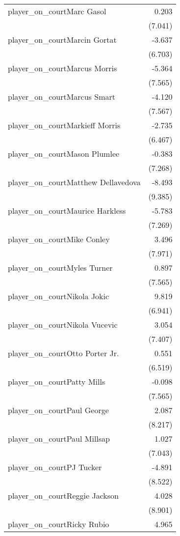 \documentclass[
  landscape]{article}
\begin{document}
\begin{table}[!htbp]
\begin{tabular}{@{\extracolsep{5pt}}lD{.}{.}{-3} }
  player\_on\_courtMarc Gasol & 0.203 \\ 
  & (7.041) \\ 
  player\_on\_courtMarcin Gortat & -3.637 \\ 
  & (6.703) \\ 
  player\_on\_courtMarcus Morris & -5.364 \\ 
  & (7.565) \\ 
  player\_on\_courtMarcus Smart & -4.120 \\ 
  & (7.567) \\ 
  player\_on\_courtMarkieff Morris & -2.735 \\ 
  & (6.467) \\ 
  player\_on\_courtMason Plumlee & -0.383 \\ 
  & (7.268) \\ 
  player\_on\_courtMatthew Dellavedova & -8.493 \\ 
  & (9.385) \\ 
  player\_on\_courtMaurice Harkless & -5.783 \\ 
  & (7.269) \\ 
  player\_on\_courtMike Conley & 3.496 \\ 
  & (7.971) \\ 
  player\_on\_courtMyles Turner & 0.897 \\ 
  & (7.565) \\ 
  player\_on\_courtNikola Jokic & 9.819 \\ 
  & (6.941) \\ 
  player\_on\_courtNikola Vucevic & 3.054 \\ 
  & (7.407) \\ 
  player\_on\_courtOtto Porter Jr. & 0.551 \\ 
  & (6.519) \\ 
  player\_on\_courtPatty Mills & -0.098 \\ 
  & (7.565) \\ 
  player\_on\_courtPaul George & 2.087 \\ 
  & (8.217) \\ 
  player\_on\_courtPaul Millsap & 1.027 \\ 
  & (7.043) \\ 
  player\_on\_courtPJ Tucker & -4.891 \\ 
  & (8.522) \\ 
  player\_on\_courtReggie Jackson & 4.028 \\ 
  & (8.901) \\ 
  player\_on\_courtRicky Rubio & 4.965 \\ 

\end{tabular}
\end{table}
\end{document}
